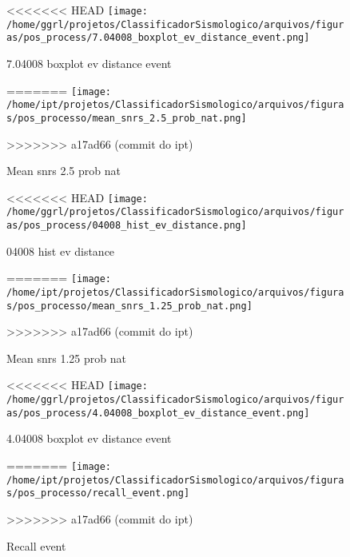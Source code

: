                     \begin{figure}[H]
                        \centering
<<<<<<< HEAD
                        \texttt{[image: /home/ggrl/projetos/ClassificadorSismologico/arquivos/figuras/pos\_process/7.04008\_boxplot\_ev\_distance\_event.png]}
                        \caption{7.04008 boxplot ev distance event}
                        \label{fig:7.04008_boxplot_ev_distance_event}
=======
                        \texttt{[image: /home/ipt/projetos/ClassificadorSismologico/arquivos/figuras/pos\_processo/mean\_snrs\_2.5\_prob\_nat.png]}
                        \caption{Mean snrs 2.5 prob nat}
                        \label{fig:mean_snrs_2.5_prob_nat}
>>>>>>> a17ad66 (commit do ipt)
                    \end{figure}
                

                    \begin{figure}[H]
                        \centering
<<<<<<< HEAD
                        \texttt{[image: /home/ggrl/projetos/ClassificadorSismologico/arquivos/figuras/pos\_process/04008\_hist\_ev\_distance.png]}
                        \caption{04008 hist ev distance}
                        \label{fig:04008_hist_ev_distance}
=======
                        \texttt{[image: /home/ipt/projetos/ClassificadorSismologico/arquivos/figuras/pos\_processo/mean\_snrs\_1.25\_prob\_nat.png]}
                        \caption{Mean snrs 1.25 prob nat}
                        \label{fig:mean_snrs_1.25_prob_nat}
>>>>>>> a17ad66 (commit do ipt)
                    \end{figure}
                

                    \begin{figure}[H]
                        \centering
<<<<<<< HEAD
                        \texttt{[image: /home/ggrl/projetos/ClassificadorSismologico/arquivos/figuras/pos\_process/4.04008\_boxplot\_ev\_distance\_event.png]}
                        \caption{4.04008 boxplot ev distance event}
                        \label{fig:4.04008_boxplot_ev_distance_event}
=======
                        \texttt{[image: /home/ipt/projetos/ClassificadorSismologico/arquivos/figuras/pos\_processo/recall\_event.png]}
                        \caption{Recall event}
                        \label{fig:recall_event}
>>>>>>> a17ad66 (commit do ipt)
                    \end{figure}
                

